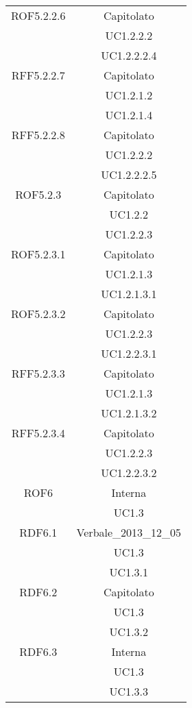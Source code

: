 \begin{longtable}{|c|c|}
\midrule
ROF5.2.2.6
& Capitolato\\
& UC1.2.2.2\\
& UC1.2.2.2.4\\

\midrule
RFF5.2.2.7
& Capitolato\\
& UC1.2.1.2\\
& UC1.2.1.4\\

\midrule
RFF5.2.2.8
& Capitolato\\
& UC1.2.2.2\\
& UC1.2.2.2.5\\

\midrule
ROF5.2.3
& Capitolato\\
& UC1.2.2\\
& UC1.2.2.3\\

\midrule
ROF5.2.3.1
& Capitolato\\
& UC1.2.1.3\\
& UC1.2.1.3.1\\

\midrule
ROF5.2.3.2
& Capitolato\\
& UC1.2.2.3\\
& UC1.2.2.3.1\\

\midrule
RFF5.2.3.3
& Capitolato\\
& UC1.2.1.3\\
& UC1.2.1.3.2\\

\midrule
RFF5.2.3.4
& Capitolato\\
& UC1.2.2.3\\
& UC1.2.2.3.2\\

\midrule
ROF6
& Interna\\
& UC1.3\\

\midrule
RDF6.1
& Verbale\_2013\_12\_05\\
& UC1.3\\
& UC1.3.1\\

\midrule
RDF6.2
& Capitolato\\
& UC1.3\\
& UC1.3.2\\

\midrule
RDF6.3
& Interna\\
& UC1.3\\
& UC1.3.3\\


\end{longtable}
